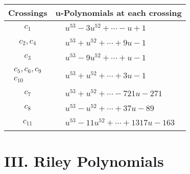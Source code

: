 \documentclass[1p]{elsarticle_modified}
\theoremstyle{definition}
\begin{document}
\begin{tabular}{m{50pt}|m{274pt}}
Crossings & \hspace{64pt}u-Polynomials at each crossing \\
\hline $$\begin{aligned}c_{1}\end{aligned}$$&$\begin{aligned}
&u^{53}-3 u^{52}+\cdots- u+1
\end{aligned}$\\
\hline $$\begin{aligned}c_{2},c_{4}\end{aligned}$$&$\begin{aligned}
&u^{53}+u^{52}+\cdots+9 u-1
\end{aligned}$\\
\hline $$\begin{aligned}c_{3}\end{aligned}$$&$\begin{aligned}
&u^{53}-9 u^{52}+\cdots+u-1
\end{aligned}$\\
\hline $$\begin{aligned}c_{5},c_{6},c_{9}\\c_{10}\end{aligned}$$&$\begin{aligned}
&u^{53}+u^{52}+\cdots+3 u-1
\end{aligned}$\\
\hline $$\begin{aligned}c_{7}\end{aligned}$$&$\begin{aligned}
&u^{53}+u^{52}+\cdots-721 u-271
\end{aligned}$\\
\hline $$\begin{aligned}c_{8}\end{aligned}$$&$\begin{aligned}
&u^{53}- u^{52}+\cdots+37 u-89
\end{aligned}$\\
\hline $$\begin{aligned}c_{11}\end{aligned}$$&$\begin{aligned}
&u^{53}-11 u^{52}+\cdots+1317 u-163
\end{aligned}$\\
\hline
\end{tabular}\newpage\renewcommand{\arraystretch}{1}
\centering \section*{ III. Riley Polynomials}
\end{document}
